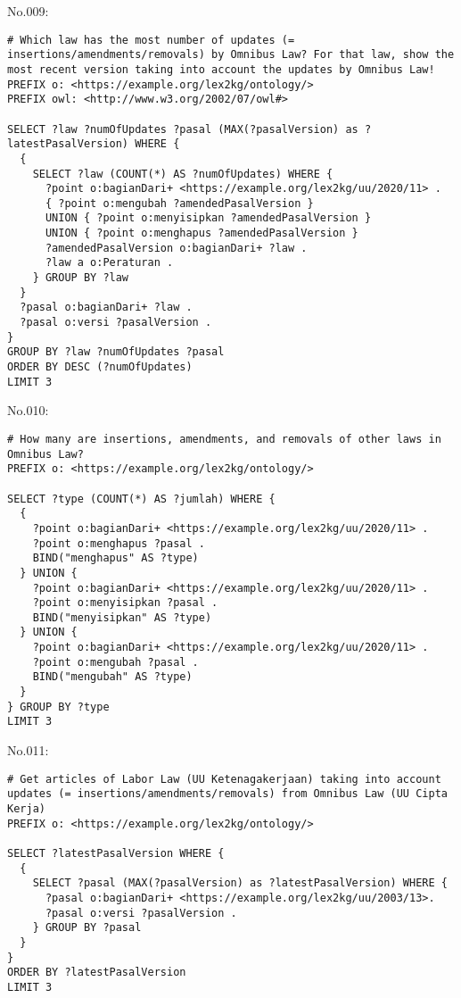 \noindent No.009:
\begin{lstlisting}
# Which law has the most number of updates (= insertions/amendments/removals) by Omnibus Law? For that law, show the most recent version taking into account the updates by Omnibus Law!
PREFIX o: <https://example.org/lex2kg/ontology/>
PREFIX owl: <http://www.w3.org/2002/07/owl#>

SELECT ?law ?numOfUpdates ?pasal (MAX(?pasalVersion) as ?latestPasalVersion) WHERE {
  {
    SELECT ?law (COUNT(*) AS ?numOfUpdates) WHERE {
      ?point o:bagianDari+ <https://example.org/lex2kg/uu/2020/11> .
      { ?point o:mengubah ?amendedPasalVersion }
      UNION { ?point o:menyisipkan ?amendedPasalVersion }
      UNION { ?point o:menghapus ?amendedPasalVersion }
      ?amendedPasalVersion o:bagianDari+ ?law .
      ?law a o:Peraturan .
    } GROUP BY ?law
  }
  ?pasal o:bagianDari+ ?law .
  ?pasal o:versi ?pasalVersion .
}
GROUP BY ?law ?numOfUpdates ?pasal
ORDER BY DESC (?numOfUpdates)
LIMIT 3

\end{lstlisting}


\noindent No.010:
\begin{lstlisting}
# How many are insertions, amendments, and removals of other laws in Omnibus Law?
PREFIX o: <https://example.org/lex2kg/ontology/>

SELECT ?type (COUNT(*) AS ?jumlah) WHERE {
  {
    ?point o:bagianDari+ <https://example.org/lex2kg/uu/2020/11> .
    ?point o:menghapus ?pasal .
    BIND("menghapus" AS ?type)
  } UNION {
    ?point o:bagianDari+ <https://example.org/lex2kg/uu/2020/11> .
    ?point o:menyisipkan ?pasal .
    BIND("menyisipkan" AS ?type)
  } UNION {
    ?point o:bagianDari+ <https://example.org/lex2kg/uu/2020/11> .
    ?point o:mengubah ?pasal .
    BIND("mengubah" AS ?type)
  }
} GROUP BY ?type
LIMIT 3

\end{lstlisting}


\noindent No.011:
\begin{lstlisting}
# Get articles of Labor Law (UU Ketenagakerjaan) taking into account updates (= insertions/amendments/removals) from Omnibus Law (UU Cipta Kerja)
PREFIX o: <https://example.org/lex2kg/ontology/>

SELECT ?latestPasalVersion WHERE {
  {
    SELECT ?pasal (MAX(?pasalVersion) as ?latestPasalVersion) WHERE {
      ?pasal o:bagianDari+ <https://example.org/lex2kg/uu/2003/13>.
      ?pasal o:versi ?pasalVersion .
    } GROUP BY ?pasal
  }
}
ORDER BY ?latestPasalVersion
LIMIT 3
\end{lstlisting}


